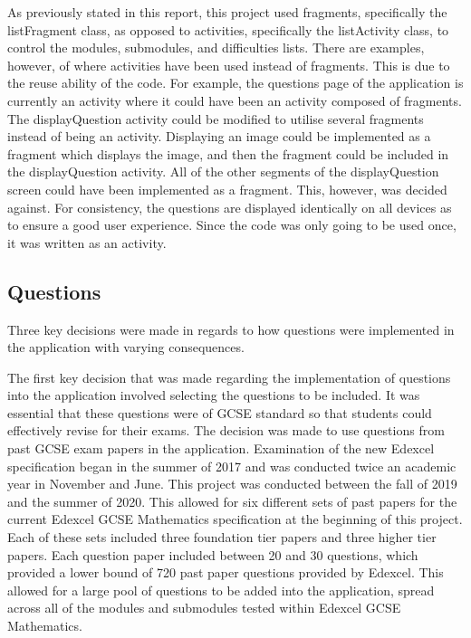 \documentclass{article}
\begin{document}
As previously stated in this report, this project used fragments, specifically the listFragment class, as opposed to activities, specifically the listActivity class, to control the modules, submodules, and difficulties lists. There are examples, however, of where activities have been used instead of fragments. This is due to the reuse ability of the code. For example, the questions page of the application is currently an activity where it could have been an activity composed of fragments. The displayQuestion activity could be modified to utilise several fragments instead of being an activity. Displaying an image could be implemented as a fragment which displays the image, and then the fragment could be included in the displayQuestion activity. All of the other segments of the displayQuestion screen could have been implemented as a fragment. This, however, was decided against. For consistency, the questions are displayed identically on all devices as to ensure a good user experience. Since the code was only going to be used once, it was written as an activity. \par

\subsection{Questions}

Three key decisions were made in regards to how questions were implemented in the application with varying consequences. \par

The first key decision that was made regarding the implementation of questions into the application involved selecting the questions to be included. It was essential that these questions were of GCSE standard so that students could effectively revise for their exams. The decision was made to use questions from past GCSE exam papers in the application. Examination of the new Edexcel specification began in the summer of 2017 and was conducted twice an academic year in November and June. This project was conducted between the fall of 2019 and the summer of 2020. This allowed for six different sets of past papers for the current Edexcel GCSE Mathematics specification at the beginning of this project. Each of these sets included three foundation tier papers and three higher tier papers. Each question paper included between 20 and 30 questions, which provided a lower bound of 720 past paper questions provided by Edexcel. This allowed for a large pool of questions to be added into the application, spread across all of the modules and submodules tested within Edexcel GCSE Mathematics. \par
\end{document}
